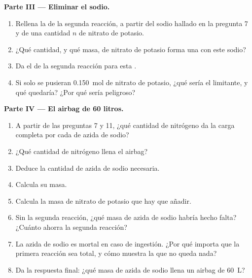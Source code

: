 \begin{problem}
\medskip
\noindent\textbf{Parte III --- Eliminar el sodio.}
\begin{enumerate}[resume]
  \item Rellena la  de la segunda reacción, a partir del
        sodio hallado en la pregunta 7 y de una cantidad $n$ de nitrato
        de potasio.
  \item ¿Qué cantidad, y qué masa, de nitrato de potasio forma una
         con este sodio?
  \item Da el  de la segunda reacción para esta .
  \item Si solo se pusieran \qty{0.150}{mol} de nitrato de potasio, ¿qué
         sería el limitante, y qué quedaría? ¿Por qué sería
        peligroso?
\end{enumerate}

\medskip
\noindent\textbf{Parte IV --- El airbag de 60 litros.}
\begin{enumerate}[resume]
  \item A partir de las preguntas 7 y 11, ¿qué cantidad de nitrógeno da
        la carga completa por cada  de azida de sodio?
  \item ¿Qué cantidad de nitrógeno llena el airbag?
  \item Deduce la cantidad de azida de sodio necesaria.
  \item Calcula su masa.
  \item Calcula la masa de nitrato de potasio que hay que añadir.
  \item Sin la segunda reacción, ¿qué masa de azida de sodio habría
        hecho falta? ¿Cuánto ahorra la segunda reacción?
  \item La azida de sodio es mortal en caso de ingestión. ¿Por qué
        importa que la primera reacción sea total, y cómo muestra la
         que no queda nada?
  \item Da la respuesta final: ¿qué masa de azida de sodio llena un
        airbag de \qty{60}{L}?
\end{enumerate}
\end{problem}

